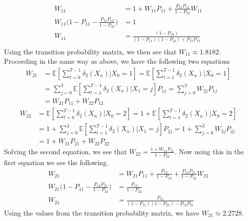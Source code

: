 \documentclass[12pt]{article}  %
\newcommand{\E}{{\mathbb{E}}}
\begin{document}
\begin{description}
\begin{align*}
W_{11} &= 1 + W_{11}P_{11} + \frac{P_{21}P_{12}}{1-P_{22}}W_{11}\\
W_{11}\Big(1 - P_{11} - \frac{P_{21}P_{12}}{1-P_{22}}\Big) &= 1 \\
W_{11} &= \frac{(1-P_{22})}{(1-P_{11})(1-P_{22}) + P_{21}P_{12}}\\
\end{align*}
Using the transition probability matrix, we then see that $W_{11} \approx 1.8182$. Proceeding in the same way as above, we have the following two equations
\begin{align*}
W_{21} &= \E\left[\sum_{t = 0}^{T-1}\delta_{2}(X_n)|X_0 = 1\right] = \E\left[\sum_{t = 1}^{T-1}\delta_{2}(X_n)|X_0 = 1\right]\\
&= \sum_{j = 0}^3\E\left[\sum_{t = 1}^{T-1}\delta_{2}(X_n)|X_1 = j\right]P_{1j} = \sum_{j = 0}^3W_{2j}P_{1j}\\
&= W_{21}P_{11} + W_{22}P_{12}
\end{align*}
\begin{align*}
W_{22} &= \E\left[\sum_{t = 0}^{T-1}\delta_{2}(X_n)|X_0 = 2\right] = 1 + \E\left[\sum_{t = 1}^{T-1}\delta_{2}(X_n)|X_0 = 2\right]\\
&= 1+\sum_{j = 0}^3\E\left[\sum_{t = 1}^{T-1}\delta_{2}(X_n)|X_1 = j\right]P_{2j} = 1+\sum_{j = 0}^3W_{2j}P_{2j}\\
&= 1 + W_{21}P_{21} + W_{22}P_{22}
\end{align*}
Solving the second equation, we see that $W_{22} = \frac{1 + W_{21}P_{21}}{1-P_{22}}$. Now using this in the first equation we see the following. 
\begin{align*}
W_{21} &= W_{21}P_{11} + \frac{P_{12}}{1-P_{22}} + \frac{P_{12}P_{21}}{1-P_{22}}W_{21}\\
W_{21}\Big(1 - P_{11} - \frac{P_{12}P_{21}}{1-P_{22}}\Big) &= \frac{P_{12}}{1-P_{22}} \\
W_{21} &= \frac{P_{12}}{(1-P_{11})(1-P_{22}) - P_{12}P_{21}}
\end{align*}
Using the values from the transition probability matrix, we have $W_{21}\approx 2.2728$. 


\end{description}
\end{document}
